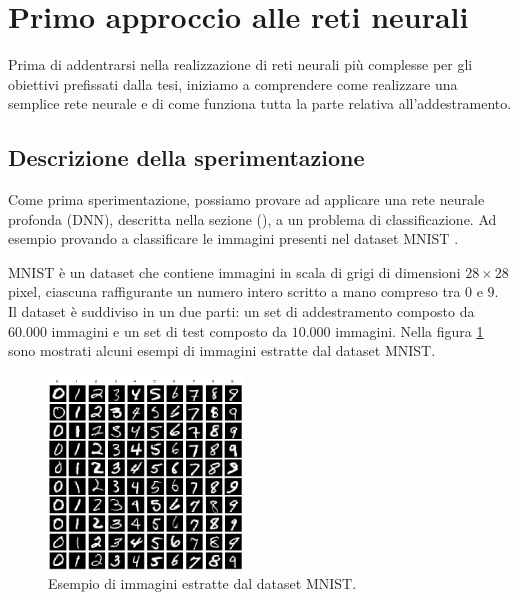 
\section{Primo approccio alle reti neurali}
\label{setion:PRIMO_CODICE}
Prima di addentrarsi nella realizzazione di reti neurali più complesse per 
gli obiettivi prefissati dalla tesi, iniziamo a comprendere come realizzare una 
semplice rete neurale e di come funziona tutta la parte relativa all'addestramento.

\subsection{Descrizione della sperimentazione}
Come prima sperimentazione, possiamo provare ad applicare una rete 
neurale profonda (DNN), descritta nella sezione (), 
a un problema di classificazione. Ad esempio provando a 
classificare le immagini presenti nel dataset MNIST \cite{MNIST_Analysis,MNIST_Kaggle}.



MNIST è un dataset che contiene immagini in scala di grigi di dimensioni $28 \times 28$ 
pixel, ciascuna raffigurante un numero intero scritto a mano compreso tra $0$ e $9$. 
Il dataset è suddiviso in un due parti: un set di addestramento composto da $60.000$ 
immagini e un set di test composto da $10.000$ immagini.
Nella figura \ref{fig:esempio_MNIST} sono mostrati alcuni esempi di immagini 
estratte dal dataset MNIST.
\begin{figure}[H]
    \centering
    \includegraphics[width=0.46\textwidth]{Immagini/Generiche/MNIST_esempio.png}
    \caption{Esempio di immagini estratte dal dataset MNIST.}
    \label{fig:esempio_MNIST}
\end{figure}

